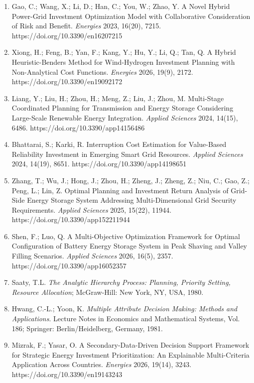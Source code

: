 \documentclass[
]{article}
\begin{document}
\begin{enumerate}
  Carazo, A.F.; Gomez, T.; Molina, J.; Hernandez-Diaz, A.G.; Guerrero, F.M.; Caballero, R. Solving a comprehensive model for multiobjective project portfolio selection. \emph{Computers \& Operations Research} 2010, 37(4), 630--639. https://doi.org/10.1016/j.cor.2009.06.012
\item
  Gao, C.; Wang, X.; Li, D.; Han, C.; You, W.; Zhao, Y. A Novel Hybrid Power-Grid Investment Optimization Model with Collaborative Consideration of Risk and Benefit. \emph{Energies} 2023, 16(20), 7215. https://doi.org/10.3390/en16207215
\item
  Xiong, H.; Feng, B.; Yan, F.; Kang, Y.; Hu, Y.; Li, Q.; Tan, Q. A Hybrid Heuristic-Benders Method for Wind-Hydrogen Investment Planning with Non-Analytical Cost Functions. \emph{Energies} 2026, 19(9), 2172. https://doi.org/10.3390/en19092172
\item
  Liang, Y.; Liu, H.; Zhou, H.; Meng, Z.; Liu, J.; Zhou, M. Multi-Stage Coordinated Planning for Transmission and Energy Storage Considering Large-Scale Renewable Energy Integration. \emph{Applied Sciences} 2024, 14(15), 6486. https://doi.org/10.3390/app14156486
\item
  Bhattarai, S.; Karki, R. Interruption Cost Estimation for Value-Based Reliability Investment in Emerging Smart Grid Resources. \emph{Applied Sciences} 2024, 14(19), 8651. https://doi.org/10.3390/app14198651
\item
  Zhang, T.; Wu, J.; Hong, J.; Zhou, H.; Zheng, J.; Zheng, Z.; Niu, C.; Gao, Z.; Peng, L.; Lin, Z. Optimal Planning and Investment Return Analysis of Grid-Side Energy Storage System Addressing Multi-Dimensional Grid Security Requirements. \emph{Applied Sciences} 2025, 15(22), 11944. https://doi.org/10.3390/app152211944
\item
  Shen, F.; Luo, Q. A Multi-Objective Optimization Framework for Optimal Configuration of Battery Energy Storage System in Peak Shaving and Valley Filling Scenarios. \emph{Applied Sciences} 2026, 16(5), 2357. https://doi.org/10.3390/app16052357
\item
  Saaty, T.L. \emph{The Analytic Hierarchy Process: Planning, Priority Setting, Resource Allocation}; McGraw-Hill: New York, NY, USA, 1980.
\item
  Hwang, C.-L.; Yoon, K. \emph{Multiple Attribute Decision Making: Methods and Applications}. Lecture Notes in Economics and Mathematical Systems, Vol. 186; Springer: Berlin/Heidelberg, Germany, 1981.
\item
  Mizrak, F.; Yasar, O. A Secondary-Data-Driven Decision Support Framework for Strategic Energy Investment Prioritization: An Explainable Multi-Criteria Application Across Countries. \emph{Energies} 2026, 19(14), 3243. https://doi.org/10.3390/en19143243

\end{enumerate}
\end{document}
